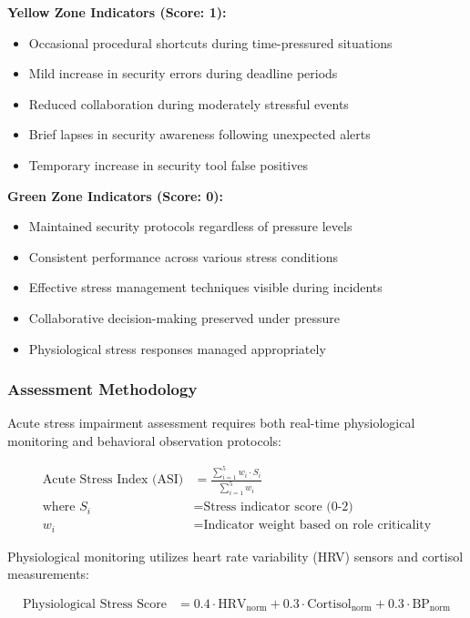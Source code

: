 \documentclass[11pt,a4paper]{article}
\begin{document}
\textbf{Yellow Zone Indicators (Score: 1):}
\begin{itemize}
\item Occasional procedural shortcuts during time-pressured situations
\item Mild increase in security errors during deadline periods
\item Reduced collaboration during moderately stressful events
\item Brief lapses in security awareness following unexpected alerts
\item Temporary increase in security tool false positives
\end{itemize}

\textbf{Green Zone Indicators (Score: 0):}
\begin{itemize}
\item Maintained security protocols regardless of pressure levels
\item Consistent performance across various stress conditions
\item Effective stress management techniques visible during incidents
\item Collaborative decision-making preserved under pressure
\item Physiological stress responses managed appropriately
\end{itemize}

\subsubsection{Assessment Methodology}

Acute stress impairment assessment requires both real-time physiological monitoring and behavioral observation protocols:

\begin{align}
\text{Acute Stress Index (ASI)} &= \frac{\sum_{i=1}^{5} w_i \cdot S_i}{\sum_{i=1}^{5} w_i} \\
\text{where } S_i &= \text{Stress indicator score (0-2)} \\
w_i &= \text{Indicator weight based on role criticality}
\end{align}

Physiological monitoring utilizes heart rate variability (HRV) sensors and cortisol measurements:

\begin{align}
\text{Physiological Stress Score} &= 0.4 \cdot \text{HRV}_{\text{norm}} + 0.3 \cdot \text{Cortisol}_{\text{norm}} + 0.3 \cdot \text{BP}_{\text{norm}}
\end{align}
\end{document}

